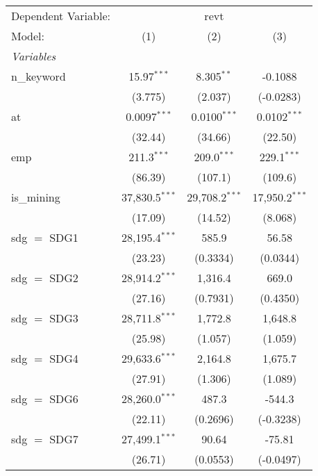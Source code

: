 
\begingroup
\centering
\begin{tabular}{lccc}
   \tabularnewline \midrule \midrule
   Dependent Variable: & \multicolumn{3}{c}{revt}\\
   Model:        & (1)              & (2)              & (3)\\  
   \midrule
   \emph{Variables}\\
   n\_keyword    & 15.97$^{***}$    & 8.305$^{**}$     & -0.1088\\   
                 & (3.775)          & (2.037)          & (-0.0283)\\   
   at            & 0.0097$^{***}$   & 0.0100$^{***}$   & 0.0102$^{***}$\\   
                 & (32.44)          & (34.66)          & (22.50)\\   
   emp           & 211.3$^{***}$    & 209.0$^{***}$    & 229.1$^{***}$\\   
                 & (86.39)          & (107.1)          & (109.6)\\   
   is\_mining    & 37,830.5$^{***}$ & 29,708.2$^{***}$ & 17,950.2$^{***}$\\   
                 & (17.09)          & (14.52)          & (8.068)\\   
   sdg $=$ SDG1  & 28,195.4$^{***}$ & 585.9            & 56.58\\   
                 & (23.23)          & (0.3334)         & (0.0344)\\   
   sdg $=$ SDG2  & 28,914.2$^{***}$ & 1,316.4          & 669.0\\   
                 & (27.16)          & (0.7931)         & (0.4350)\\   
   sdg $=$ SDG3  & 28,711.8$^{***}$ & 1,772.8          & 1,648.8\\   
                 & (25.98)          & (1.057)          & (1.059)\\   
   sdg $=$ SDG4  & 29,633.6$^{***}$ & 2,164.8          & 1,675.7\\   
                 & (27.91)          & (1.306)          & (1.089)\\   
   sdg $=$ SDG6  & 28,260.0$^{***}$ & 487.3            & -544.3\\   
                 & (22.11)          & (0.2696)         & (-0.3238)\\   
   sdg $=$ SDG7  & 27,499.1$^{***}$ & 90.64            & -75.81\\   
                 & (26.71)          & (0.0553)         & (-0.0497)\\   

\end{tabular}
